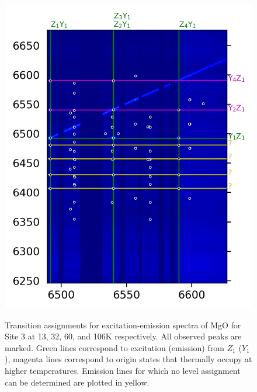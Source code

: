 \documentclass[12pt]{report}
\begin{document}
\begin{figure}[b]
{    \includegraphics[scale=0.97]{JinD_site3_106K}
  }{}
  \caption{Transition assignments for excitation-emission spectra of MgO for Site 3 at 13, 32, 60, and 106K respectively. All observed peaks are marked. Green lines correspond to excitation (emission) from $Z_{1}$ ($Y_{1}$), magenta lines correspond to origin states that thermally occupy at higher temperatures. Emission lines for which no level assignment can be determined are plotted in yellow.}
  \label{fig:mgosite3}
\end{figure}
\end{document}
